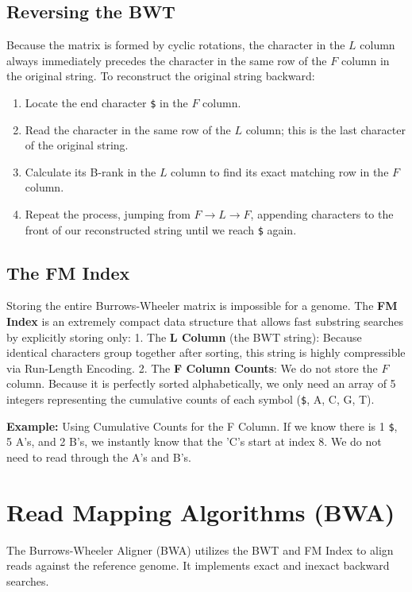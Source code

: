\documentclass[11pt, a4paper]{article}
\begin{document}
\subsection{Reversing the BWT}
Because the matrix is formed by cyclic rotations, the character in the $L$ column always immediately precedes the character in the same row of the $F$ column in the original string. 
To reconstruct the original string backward:
\begin{enumerate}
    \item Locate the end character \texttt{\$} in the $F$ column.
    \item Read the character in the same row of the $L$ column; this is the last character of the original string.
    \item Calculate its B-rank in the $L$ column to find its exact matching row in the $F$ column.
    \item Repeat the process, jumping from $F \to L \to F$, appending characters to the front of our reconstructed string until we reach \texttt{\$} again.
\end{enumerate}

\subsection{The FM Index}
Storing the entire Burrows-Wheeler matrix is impossible for a genome. The \textbf{FM Index} is an extremely compact data structure that allows fast substring searches by explicitly storing only:
1. The \textbf{L Column} (the BWT string): Because identical characters group together after sorting, this string is highly compressible via Run-Length Encoding.
2. The \textbf{F Column Counts}: We do not store the $F$ column. Because it is perfectly sorted alphabetically, we only need an array of 5 integers representing the cumulative counts of each symbol (\texttt{\$}, A, C, G, T).

\textbf{Example:} Using Cumulative Counts for the F Column.
If we know there is 1 \texttt{\$}, 5 A's, and 2 B's, we instantly know that the 'C's start at index 8. We do not need to read through the A's and B's.

\section{Read Mapping Algorithms (BWA)}
The Burrows-Wheeler Aligner (BWA) utilizes the BWT and FM Index to align reads against the reference genome. It implements exact and inexact backward searches.
\end{document}
